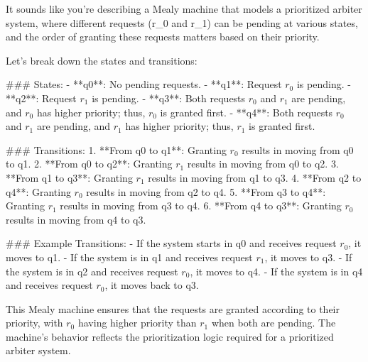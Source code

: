It sounds like you're describing a Mealy machine that models a prioritized arbiter system, where different requests (r_0 and r_1) can be pending at various states, and the order of granting these requests matters based on their priority.

Let's break down the states and transitions:

### States:
- **q0**: No pending requests.
- **q1**: Request \( r_0 \) is pending.
- **q2**: Request \( r_1 \) is pending.
- **q3**: Both requests \( r_0 \) and \( r_1 \) are pending, and \( r_0 \) has higher priority; thus, \( r_0 \) is granted first.
- **q4**: Both requests \( r_0 \) and \( r_1 \) are pending, and \( r_1 \) has higher priority; thus, \( r_1 \) is granted first.

### Transitions:
1. **From q0 to q1**: Granting \( r_0 \) results in moving from q0 to q1.
2. **From q0 to q2**: Granting \( r_1 \) results in moving from q0 to q2.
3. **From q1 to q3**: Granting \( r_1 \) results in moving from q1 to q3.
4. **From q2 to q4**: Granting \( r_0 \) results in moving from q2 to q4.
5. **From q3 to q4**: Granting \( r_1 \) results in moving from q3 to q4.
6. **From q4 to q3**: Granting \( r_0 \) results in moving from q4 to q3.

### Example Transitions:
- If the system starts in q0 and receives request \( r_0 \), it moves to q1.
- If the system is in q1 and receives request \( r_1 \), it moves to q3.
- If the system is in q2 and receives request \( r_0 \), it moves to q4.
- If the system is in q4 and receives request \( r_0 \), it moves back to q3.

This Mealy machine ensures that the requests are granted according to their priority, with \( r_0 \) having higher priority than \( r_1 \) when both are pending. The machine's behavior reflects the prioritization logic required for a prioritized arbiter system.